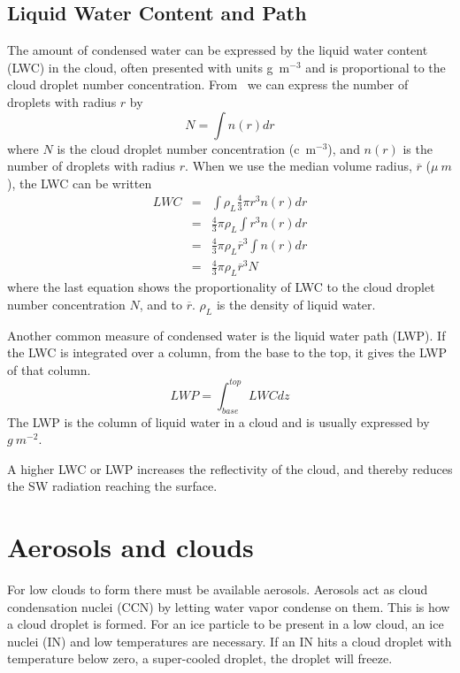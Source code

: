 \subsection{Liquid Water Content and Path}
 The amount of condensed water can be expressed by the liquid water content (LWC) in the cloud, often presented with units g~m$^{-3}$ and is proportional to the cloud droplet number concentration. From~\citet{Rogers1989} we can express the number of droplets with radius $r$ by
\begin{equation}
N = \int n(r) dr
\end{equation}
where $N$ is the cloud droplet number concentration (c~m$^{-3}$), and $n(r)$ is the number of droplets with radius $r$. When we use the median volume radius, $\overline{r}$ ($\mu~m$), the LWC can be written
\begin{eqnarray}
LWC &=& \int \rho_L \frac{4}{3} \pi r^3 n(r) dr\\
&=& \frac{4}{3} \pi \rho_L \int r^3 n(r) dr\\
&=& \frac{4}{3} \pi \rho_L \overline{r}^3 \int n(r) dr\\
&=& \frac{4}{3} \pi \rho_L \overline{r}^3 N 
\end{eqnarray}
where the last equation shows the proportionality of LWC to the cloud droplet number concentration $N$, and to $\overline{r}$. $\rho_L$ is the density of liquid water.

Another common measure of condensed water is the liquid water path (LWP).
If the LWC is integrated over a column, from the base to the top, it gives the LWP of that column.
\begin{equation}
LWP = \int_{base}^{top} LWC dz
\end{equation}
The LWP is the column of liquid water in a cloud and is usually expressed by $g~m^{-2}$.

A higher LWC or LWP increases the reflectivity of the cloud, and thereby reduces the SW radiation reaching the surface.


\section{Aerosols and clouds}%
For low clouds to form there must be available aerosols. Aerosols act as cloud condensation nuclei (CCN) by letting water vapor condense on them. This is how a cloud droplet is formed. For an ice particle to be present in a low cloud, an ice nuclei (IN) and low temperatures %
are necessary. If an IN hits a cloud droplet with temperature below zero, a super-cooled droplet, the droplet will freeze.

